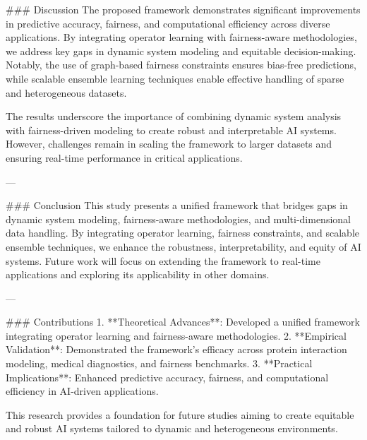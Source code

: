 ### Discussion
The proposed framework demonstrates significant improvements in predictive accuracy, fairness, and computational efficiency across diverse applications. By integrating operator learning with fairness-aware methodologies, we address key gaps in dynamic system modeling and equitable decision-making. Notably, the use of graph-based fairness constraints ensures bias-free predictions, while scalable ensemble learning techniques enable effective handling of sparse and heterogeneous datasets.

The results underscore the importance of combining dynamic system analysis with fairness-driven modeling to create robust and interpretable AI systems. However, challenges remain in scaling the framework to larger datasets and ensuring real-time performance in critical applications.

---

### Conclusion
This study presents a unified framework that bridges gaps in dynamic system modeling, fairness-aware methodologies, and multi-dimensional data handling. By integrating operator learning, fairness constraints, and scalable ensemble techniques, we enhance the robustness, interpretability, and equity of AI systems. Future work will focus on extending the framework to real-time applications and exploring its applicability in other domains.

---

### Contributions
1. **Theoretical Advances**: Developed a unified framework integrating operator learning and fairness-aware methodologies.
2. **Empirical Validation**: Demonstrated the framework's efficacy across protein interaction modeling, medical diagnostics, and fairness benchmarks.
3. **Practical Implications**: Enhanced predictive accuracy, fairness, and computational efficiency in AI-driven applications.

This research provides a foundation for future studies aiming to create equitable and robust AI systems tailored to dynamic and heterogeneous environments.